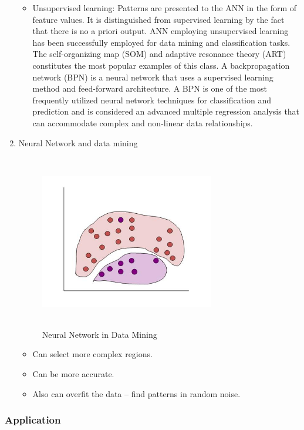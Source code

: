 \documentclass[a4paper,14pt,onecolumn]{article}
\begin{document}
\begin{enumerate}
\begin{itemize}
\item Unsupervised learning: Patterns are presented to the ANN in the form of feature values. It is distinguished from supervised learning by the fact that there is no a priori output. ANN employing unsupervised learning has been successfully employed for data mining and classification tasks. The self-organizing map (SOM) and adaptive resonance theory (ART) constitutes the most popular examples of this class. A backpropagation network (BPN) is a neural network that uses a supervised learning method and feed-forward architecture. A BPN is one of the most frequently utilized neural network techniques for classification and prediction and is considered an advanced multiple regression analysis that can accommodate complex and non-linear data relationships.
\end{itemize}

\item Neural Network and data mining
\begin{figure}[hbp]
\begin{center}
\includegraphics[height=3in,width=3in]
{NNdatamining.jpg}  
\caption{Neural Network in Data Mining}
\end{center}
\end{figure}
\begin{itemize}
\item Can select more complex regions.
\item Can be more accurate.
\item Also can overfit the data – find patterns in random noise.
\end{itemize}
\end{enumerate}

\subsubsection{Application}
\end{document}
